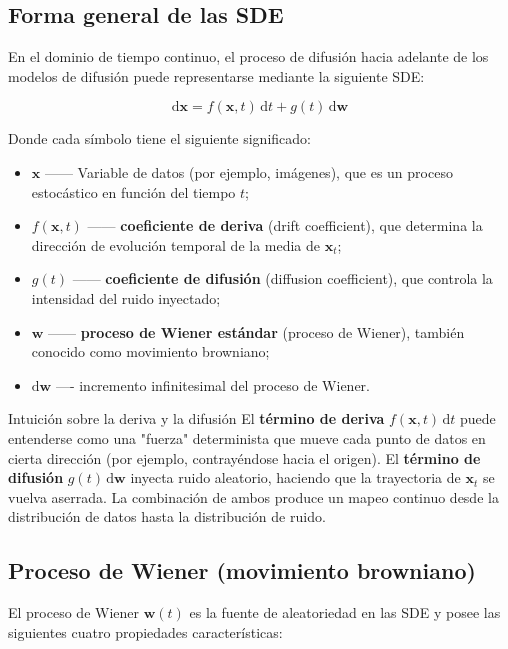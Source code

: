 \documentclass[a4paper]{article}
\begin{document}
\subsection{Forma general de las SDE}

En el dominio de tiempo continuo, el proceso de difusión hacia adelante de los modelos de difusión puede representarse mediante la siguiente SDE:

$$
\mathrm{d}\mathbf{x} = f(\mathbf{x}, t)\,\mathrm{d}t + g(t)\,\mathrm{d}\mathbf{w}
$$

Donde cada símbolo tiene el siguiente significado:

\begin{itemize}
    \item $\mathbf{x}$ —— Variable de datos (por ejemplo, imágenes), que es un proceso estocástico en función del tiempo $t$;
    \item $f(\mathbf{x}, t)$ —— \textbf{coeficiente de deriva} (drift coefficient), que determina la dirección de evolución temporal de la media de $\mathbf{x}_t$;
    \item $g(t)$ —— \textbf{coeficiente de difusión} (diffusion coefficient), que controla la intensidad del ruido inyectado;
    \item $\mathbf{w}$ —— \textbf{proceso de Wiener estándar} (proceso de Wiener), también conocido como movimiento browniano;
    \item $\mathrm{d}\mathbf{w}$ —- incremento infinitesimal del proceso de Wiener.
\end{itemize}

\begin{importantbox}{Intuición sobre la deriva y la difusión}
El \textbf{término de deriva} $f(\mathbf{x}, t)\,\mathrm{d}t$ puede entenderse como una "fuerza" determinista que mueve cada punto de datos en cierta dirección (por ejemplo, contrayéndose hacia el origen). El \textbf{término de difusión} $g(t)\,\mathrm{d}\mathbf{w}$ inyecta ruido aleatorio, haciendo que la trayectoria de $\mathbf{x}_t$ se vuelva aserrada. La combinación de ambos produce un mapeo continuo desde la distribución de datos hasta la distribución de ruido.
\end{importantbox}

\subsection{Proceso de Wiener (movimiento browniano)}

El proceso de Wiener $\mathbf{w}(t)$ es la fuente de aleatoriedad en las SDE y posee las siguientes cuatro propiedades características:
\end{document}
